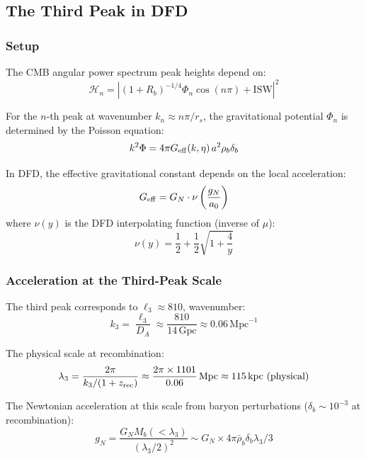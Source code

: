 \documentclass[11pt,a4paper]{article}
\begin{document}
\subsection{The Third Peak in DFD}

\subsubsection{Setup}

The CMB angular power spectrum peak heights depend on:
\begin{equation}
\mathcal{H}_n = \left|(1 + R_b)^{-1/4}\Phi_n\cos(n\pi) + \text{ISW}\right|^2
\end{equation}

For the $n$-th peak at wavenumber $k_n \approx n\pi/r_s$, the gravitational potential $\Phi_n$ is determined by the Poisson equation:
\begin{equation}
k^2\Phi = 4\pi G_{\rm eff}(k,\eta)\,a^2\rho_b\delta_b
\end{equation}

In DFD, the effective gravitational constant depends on the local acceleration:
\begin{equation}
G_{\rm eff} = G_N\cdot\nu\left(\frac{g_N}{a_0}\right)
\end{equation}
where $\nu(y)$ is the DFD interpolating function (inverse of $\mu$):
\begin{equation}
\nu(y) = \frac{1}{2} + \frac{1}{2}\sqrt{1 + \frac{4}{y}}
\end{equation}

\subsubsection{Acceleration at the Third-Peak Scale}

The third peak corresponds to $\ell_3 \approx 810$, wavenumber:
\begin{equation}
k_3 = \frac{\ell_3}{D_A} \approx \frac{810}{14\,\text{Gpc}} \approx 0.06\,\text{Mpc}^{-1}
\end{equation}

The physical scale at recombination:
\begin{equation}
\lambda_3 = \frac{2\pi}{k_3/(1+z_{\rm rec})} \approx \frac{2\pi \times 1101}{0.06}\,\text{Mpc} \approx 115\,\text{kpc (physical)}
\end{equation}

The Newtonian acceleration at this scale from baryon perturbations ($\delta_b \sim 10^{-3}$ at recombination):
\begin{equation}
g_N = \frac{G_N M_b(<\lambda_3)}{(\lambda_3/2)^2} \sim G_N \times 4\pi\bar{\rho}_b\delta_b\lambda_3/3
\end{equation}
\end{document}
